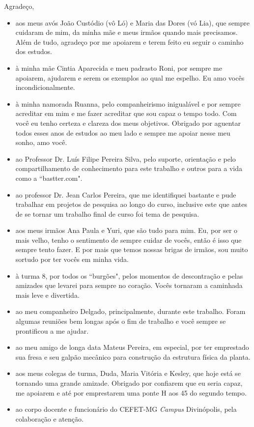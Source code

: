 \noindent Agradeço,\\[2mm]
\begin{itemize}
    \item aos meus avós João Custódio (vô Ló) e Maria das Dores (vó Lia), que sempre cuidaram de mim, da minha mãe e meus irmãos quando mais precisamos. Além de tudo, agradeço por me apoiarem e terem feito eu seguir o caminho dos estudos.
    \item à minha mãe Cintia Aparecida e meu padrasto Roni, por sempre me  apoiarem, ajudarem e serem os exemplos ao qual me espelho. Eu amo vocês incondicionalmente.
    \item à minha namorada Ruanna, pelo companheirismo inigualável e por sempre acreditar em mim e me fazer acreditar que sou capaz o tempo todo. Com você eu tenho certeza e clareza dos meus objetivos. Obrigado por aguentar todos esses anos de estudos ao meu lado e sempre me apoiar nesse meu sonho, amo você.
    \item ao Professor Dr. Luís Filipe Pereira Silva, pelo suporte, orientação e pelo compartilhamento de conhecimento para este trabalho e outros para a vida como a ``bastter.com".
    \item ao professor Dr. Jean Carlos Pereira, que me identifiquei bastante e pude trabalhar em projetos de pesquisa ao longo do curso, inclusive este que antes de se tornar um trabalho final de curso foi tema de pesquisa.
    \item aos meus irmãos Ana Paula e Yuri, que são tudo para mim. Eu, por ser o mais velho, tenho o sentimento de sempre cuidar de vocês, então é isso que sempre tento fazer. E por mais que temos nossas brigas de irmãos, sou muito sortudo por ter vocês em minha vida.
    \item à turma 8, por todos os ``burgões", pelos momentos de descontração e pelas amizades que levarei para sempre no coração. Vocês tornaram a caminhada mais leve e divertida.
    \item ao meu companheiro Delgado, principalmente, durante este trabalho. Foram algumas reuniões bem longas após o fim de trabalho e você sempre se prontificou a me ajudar.
    \item ao meu amigo de longa data Mateus Pereira, em especial, por ter emprestado sua fresa e seu galpão mecânico para construção da estrutura física da planta.
    \item aos meus colegas de turma, Duda, Maria Vitória e Kesley, que hoje está se tornando uma grande amizade. Obrigado por confiarem que eu seria capaz, me apoiarem e até por emprestarem uma ponte H aos 45 do segundo tempo.
    \item ao corpo docente e funcionário do CEFET-MG \textit{Campus} Divinópolis, pela colaboração e atenção.

\end{itemize}

